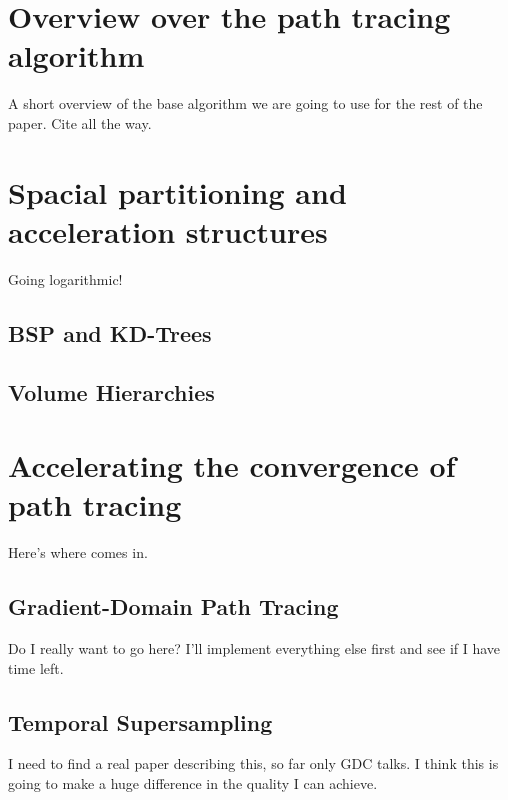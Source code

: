 \documentclass{ACGSeminar}
\begin{document}
\begin{figure}[htb!]
  \begin{centering}
    \par
  \end{centering}
  \label{fig:test_cube}
\end{figure}


\section{Overview over the path tracing algorithm}
A short overview of the base algorithm we are going to use for the rest of the paper. Cite \cite{veach1997robust} all the way.


\section{Spacial partitioning and acceleration structures}
Going logarithmic!
\subsection{BSP and KD-Trees}
\subsection{Volume Hierarchies}

\section{Accelerating the convergence of path tracing}
Here's where \cite{Pharr:2010:PBR:1854996} comes in.
\subsection{Gradient-Domain Path Tracing}
Do I really want to go here? \cite{Kettunen2015sg} I'll implement everything else first and see if I have time left.
\subsection{Temporal Supersampling}
I need to find a real paper describing this, so far only GDC talks. I think this is going to make a huge difference in the quality I can achieve.
\end{document}
